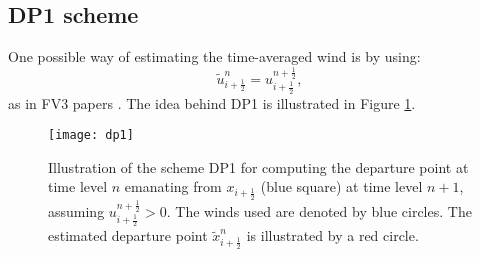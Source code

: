 \subsection{DP1 scheme}
\label{chp-adv1d-sec-DP1}
One possible way of estimating the time-averaged wind is by using:
\begin{equation}
	\label{chp-sec-dp-eq5}
	\tilde{u}^n_{i+\frac{1}{2}} = u^{n+\frac{1}{2}}_{i+\frac{1}{2}},
\end{equation}
as in FV3 papers \citep{lin:1996,putman:2007}.
{The idea behind DP1 is illustrated in Figure \ref{dp1-fig}.}


\begin{figure}[!htb]
	\centering
	\texttt{[image: dp1]}
	\caption{Illustration of the scheme DP1 for computing the departure point at time level $n$ emanating from $x_{i+\frac{1}{2}}$ (blue square) at time level $n+1$, assuming $u^{n+\frac{1}{2}}_{i+\frac{1}{2}}>0$. The winds used are denoted by blue circles. The estimated departure point $\tilde{x}_{i+\frac{1}{2}}^n$ is illustrated by a red circle. \label{dp1-fig}}
\end{figure}

